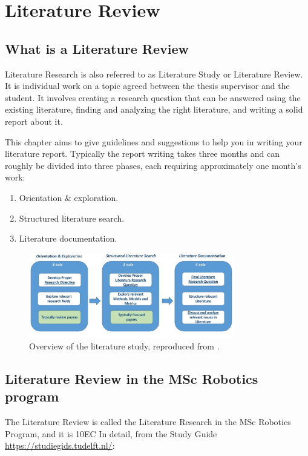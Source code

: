 \chapter{Literature Review}

\section{What is a Literature Review}
Literature Research is also referred to as Literature Study or Literature Review.
It is individual work on a topic agreed between the thesis supervisor and the student.
It involves creating a research question that can be answered using the existing literature, finding and analyzing the right literature, and writing a solid report about it.

This chapter aims to give guidelines and suggestions to help you in writing your literature report. Typically the report writing takes three months and can roughly be divided into three phases, each requiring approximately one month’s work:
\begin{enumerate}
    \item Orientation \& exploration.
    \item Structured literature search.
    \item Literature documentation.
\end{enumerate}

\begin{figure}[h!]
	\centering
	\includegraphics[width=0.8\textwidth]{figures/literatu_study_process.png}
	\caption{Overview of the literature study, reproduced from \cite{Master Thesis Guide, HRI section Cognitive Robotics}.}
	\label{fig:dexnet3_functionality}
\end{figure}

\section{Literature Review in the MSc Robotics program}
The Literature Review is called the Literature Research in the MSc Robotics Program, and it is 10EC
In detail, from the Study Guide \url{https://studiegids.tudelft.nl/}:

